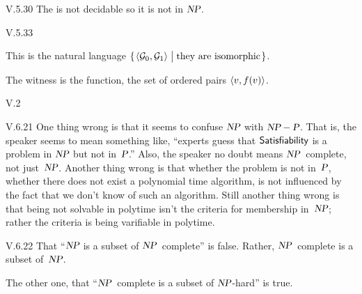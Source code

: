 %
\begin{ans}{V.5.30}
The \HP{} is not decidable so it is not in $\NP$.
\end{ans}
%
%
%
\begin{ans}{V.5.33}
\begin{exparts}
\item This is the natural language
$\set{\sequence{\mathcal{G}_0,\mathcal{G}_1}\suchthat\text{they are isomorphic}}$.
\item
The witness is the function, the set of ordered pairs $\sequence{v,f(v)}$.
\end{exparts}
\end{ans}
%
%
%
\begin{ans}{V.2}
\begin{exparts}
\item
\end{exparts}
\end{ans}
%
\begin{ans}{V.6.21}
One thing wrong is that it seems to confuse $\NP$ with $\NP-\P$.
That is, the speaker seems to mean something like, ``experts guess that
$\probname{Satisfiability}$ is a problem in $\NP$ but not in~$\P$.''
Also, the speaker no doubt means $\NP$~complete, not just~$\NP$.
Another thing wrong is that whether the problem is not in~$\P$, whether
there does not exist a polynomial time algorithm, is not influenced by the
fact that we don't know of such an algorithm.
Still another thing wrong is that being not solvable in polytime isn't the
criteria for membership in~$\NP$; rather the criteria is being varifiable
in polytime.
\end{ans}
%
\begin{ans}{V.6.22}
That ``$\NP$ is a subset of $\NP$~complete'' is false.
Rather, $\NP$~complete is a subset of~$\NP$.

The other one, that ``$\NP$~complete is a subset of $\NP$-hard'' is true.
\end{ans}
%
